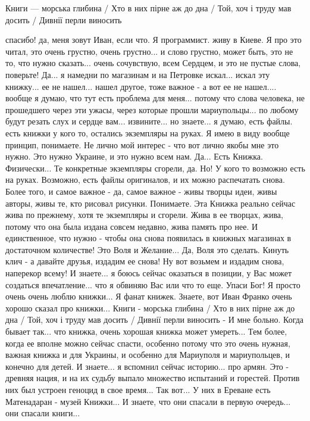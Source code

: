 Книги — морська глибина / Хто в них пірне аж до дна / Той, хоч і труду мав досить / Дивнії перли виносить

спасибо! да, меня зовут Иван, если что. Я программист. живу в Киеве. Я про это
читал, это очень грустно, очень грустно... и слово грустно, может быть, это не
то, что нужно сказать... очень сочувствую, всем Сердцем, и это не пустые слова,
поверьте! Да... я намедни по магазинам и на Петровке искал... искал эту
книжку... ее не нашел... нашел другое, тоже важное - а вот ее не нашел....
вообще я думаю, что тут есть проблема для меня... потому что слова человека, не
прошедшего через эти ужасы, через которые прошли мариупольцы... по любому будут
резать слух и сердце вам... извините... но знаете... я думаю, есть файлы. есть
книжки у кого то, остались экземпляры на руках. Я имею в виду вообще принцип,
понимаете. Не лично мой интерес - что вот лично якобы мне это нужно. Это нужно
Украине, и это нужно всем нам. Да... Есть Книжка. Физически... Те конкретные
экземпляры сгорели, да. Но! У кого то возможно есть на руках. Возможно, есть
файлы оригиналов, и их можно распечатать снова. Более того, и самое важное -
да, самое важное - живы творцы идеи, живы авторы, живы те, кто рисовал рисунки.
Понимаете. Эта Книжка реально сейчас жива по прежнему, хотя те экземпляры и
сгорели. Жива в ее творцах, жива, потому что она была издана совсем недавно,
жива память про нее. И единственное, что нужно - чтобы она снова появилась в
книжных магазинах в достаточном количестве! Это Воля и Желание... Да, Воля это
сделать. Кинуть клич - а давайте друзья, издадим ее снова! Ну вот возьмем и
издадим снова, наперекор всему! И знаете... я боюсь сейчас оказаться в позиции,
у Вас может создаться впечатление... что я обвиняю Вас или что то еще. Упаси
Бог! Я просто очень очень люблю книжки... Я фанат книжек. Знаете, вот Иван
Франко очень хорошо сказал про книжки... Книги - морська глибина / Хто в них
пірне аж до дна / Той, хоч і труду мав досить / Дивнії перли виносить - И мне
больно. Когда бывает так... что книжка, очень хорошая книжка может умереть...
Тем более, когда ее вполне можно сейчас спасти, особенно потому что это очень
нужная, важная книжка и для Украины, и особенно для Мариуполя и мариупольцев, и
конечно для детей. И знаете... я вспомнил сейчас историю... про армян. Это -
древняя нация, и на их судьбу выпало множество испытаний и горестей. Против них
был устроен геноцид в свое время... Так вот... У них в Ереване есть Матенадаран
- музей Книжки... И знаете, что они спасали в первую очередь... они спасали
книги...

